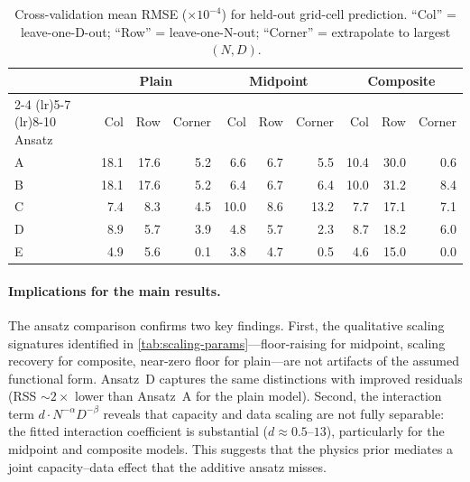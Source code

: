 \documentclass[11pt]{article}
\begin{document}
\begin{table}[H]
    \centering
    \caption{Cross-validation mean RMSE ($\times 10^{-4}$) for held-out grid-cell prediction.
    ``Col'' = leave-one-D-out; ``Row'' = leave-one-N-out; ``Corner'' = extrapolate to largest $(N,D)$.}
    \label{tab:ansatz-cv}
    \small
    \begin{tabular}{l rrr rrr rrr}
        \toprule
        & \multicolumn{3}{c}{Plain} & \multicolumn{3}{c}{Midpoint} & \multicolumn{3}{c}{Composite} \\
        \cmidrule(lr){2-4} \cmidrule(lr){5-7} \cmidrule(lr){8-10}
        Ansatz & Col & Row & Corner & Col & Row & Corner & Col & Row & Corner \\
        \midrule
        A & 18.1 & 17.6 & 5.2 & 6.6 & 6.7 & 5.5 & 10.4 & 30.0 & 0.6 \\
        B & 18.1 & 17.6 & 5.2 & 6.4 & 6.7 & 6.4 & 10.0 & 31.2 & 8.4 \\
        C & 7.4 & 8.3 & 4.5 & 10.0 & 8.6 & 13.2 & 7.7 & 17.1 & 7.1 \\
        D & 8.9 & 5.7 & 3.9 & 4.8 & 5.7 & 2.3 & 8.7 & 18.2 & 6.0 \\
        E & 4.9 & 5.6 & 0.1 & 3.8 & 4.7 & 0.5 & 4.6 & 15.0 & 0.0 \\
        \bottomrule
    \end{tabular}
\end{table}

\paragraph{Implications for the main results.}
The ansatz comparison confirms two key findings.
First, the qualitative scaling signatures identified in \cref{tab:scaling-params}---floor-raising for midpoint, scaling recovery for composite, near-zero floor for plain---are not artifacts of the assumed functional form.
Ansatz~D captures the same distinctions with improved residuals (RSS $\sim\!2\times$ lower than Ansatz~A for the plain model).
Second, the interaction term $d \cdot N^{-\alpha} D^{-\beta}$ reveals that capacity and data scaling are not fully separable: the fitted interaction coefficient is substantial ($d \approx 0.5$--$13$), particularly for the midpoint and composite models.
This suggests that the physics prior mediates a joint capacity--data effect that the additive ansatz misses.

\end{document}

